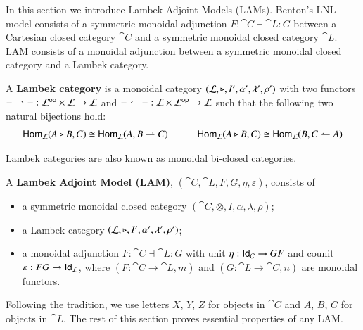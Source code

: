 In this section we introduce Lambek Adjoint Models (LAMs). Benton's
LNL model consists of a symmetric monoidal adjunction
$F:\cat{C}\dashv\cat{L}:G$ between a Cartesian closed category
$\cat{C}$ and a symmetric monoidal closed category $\cat{L}$. LAM
consists of a monoidal adjunction between a symmetric monoidal closed
category and a Lambek category.
\begin{definition}
  \label{def:lambek-category}
  A \textbf{Lambek category} is a monoidal category $(\mathcal{L},\triangleright,I',\alpha',\lambda',\rho')$
  with two functors $- \rightharpoonup - : \mathcal{L}^{\mathsf{op}} \times \mathcal{L} \rightarrow \mathcal{L}$ and
  $- \leftharpoonup - : \mathcal{L} \times \mathcal{L}^{\mathsf{op}} \rightarrow \mathcal{L}$ such that the following
  two natural bijections hold:
  \[
  \begin{array}{lllll}
    \mathsf{Hom}_{\mathcal{L}}(A \triangleright B,C) \cong \mathsf{Hom}_{\mathcal{L}}(A,B \rightharpoonup C) & \quad &
    \mathsf{Hom}_{\mathcal{L}}(A \triangleright B,C) \cong \mathsf{Hom}_{\mathcal{L}}(B,C \leftharpoonup A)\\
  \end{array}
  \]  
\end{definition}
\noindent
Lambek categories are also known as monoidal bi-closed categories.

\begin{definition}
  A \textbf{Lambek Adjoint Model (LAM)}, $(\cat{C},\cat{L},F,G,\eta,\varepsilon)$, consists of
  \begin{itemize}
  \item a symmetric monoidal closed category $(\cat{C},\otimes,I,\alpha,\lambda,\rho)$;
  \item a Lambek category $(\mathcal{L},\triangleright,I',\alpha',\lambda',\rho')$;
  \item a monoidal adjunction $F:\cat{C}\dashv\cat{L}:G$ with unit $\eta:\mathsf{Id}_{\mathcal{C}} \rightarrow GF$ and
        counit $\varepsilon:FG\rightarrow \mathsf{Id}_{\mathcal{L}}$, where $(F:\cat{C}\rightarrow\cat{L}, m)$
        and $(G:\cat{L}\rightarrow\cat{C}, n)$ are monoidal functors.
  \end{itemize}
\end{definition}
\noindent
Following the tradition, we use letters $X$, $Y$, $Z$ for objects in
$\cat{C}$ and $A$, $B$, $C$ for objects in $\cat{L}$. The rest of this
section proves essential properties of any LAM.

